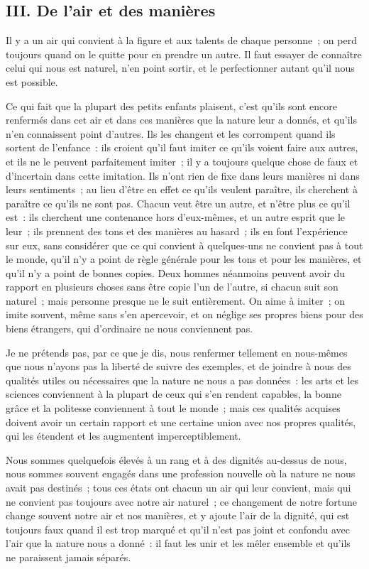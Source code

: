 \documentclass[french,twoside]{book} %
\begin{document}
\subsection[{III. De l’air et des manières}]{III. De l’air et des manières}
\noindent Il y a un air qui convient à la figure et aux talents de chaque personne ; on perd toujours quand on le quitte pour en prendre un autre. Il faut essayer de connaître celui qui nous est naturel, n’en point sortir, et le perfectionner autant qu’il nous est possible.\par
Ce qui fait que la plupart des petits enfants plaisent, c’est qu’ils sont encore renfermés dans cet air et dans ces manières que la nature leur a donnés, et qu’ils n’en connaissent point d’autres. Ils les changent et les corrompent quand ils sortent de l’enfance : ils croient qu’il faut imiter ce qu’ils voient faire aux autres, et ils ne le peuvent parfaitement imiter ; il y a toujours quelque chose de faux et d’incertain dans cette imitation. Ils n’ont rien de fixe dans leurs manières ni dans leurs sentiments ; au lieu d’être en effet ce qu’ils veulent paraître, ils cherchent à paraître ce qu’ils ne sont pas. Chacun veut être un autre, et n’être plus ce qu’il est : ils cherchent une contenance hors d’eux-mêmes, et un autre esprit que le leur ; ils prennent des tons et des manières au hasard ; ils en font l’expérience sur eux, sans considérer que ce qui convient à quelques-uns ne convient pas à tout le monde, qu’il n’y a point de règle générale pour les tons et pour les manières, et qu’il n’y a point de bonnes copies. Deux hommes néanmoins peuvent avoir du rapport en plusieurs choses sans être copie l’un de l’autre, si chacun suit son naturel ; mais personne presque ne le suit entièrement. On aime à imiter ; on imite souvent, même sans s’en apercevoir, et on néglige ses propres biens pour des biens étrangers, qui d’ordinaire ne nous conviennent pas.\par
Je ne prétends pas, par ce que je dis, nous renfermer tellement en nous-mêmes que nous n’ayons pas la liberté de suivre des exemples, et de joindre à nous des qualités utiles ou nécessaires que la nature ne nous a pas données : les arts et les sciences conviennent à la plupart de ceux qui s’en rendent capables, la bonne grâce et la politesse conviennent à tout le monde ; mais ces qualités acquises doivent avoir un certain rapport et une certaine union avec nos propres qualités, qui les étendent et les augmentent imperceptiblement.\par
Nous sommes quelquefois élevés à un rang et à des dignités au-dessus de nous, nous sommes souvent engagés dans une profession nouvelle où la nature ne nous avait pas destinés ; tous ces états ont chacun un air qui leur convient, mais qui ne convient pas toujours avec notre air naturel ; ce changement de notre fortune change souvent notre air et nos manières, et y ajoute l’air de la dignité, qui est toujours faux quand il est trop marqué et qu’il n’est pas joint et confondu avec l’air que la nature nous a donné : il faut les unir et les mêler ensemble et qu’ils ne paraissent jamais séparés.\par
\end{document}
